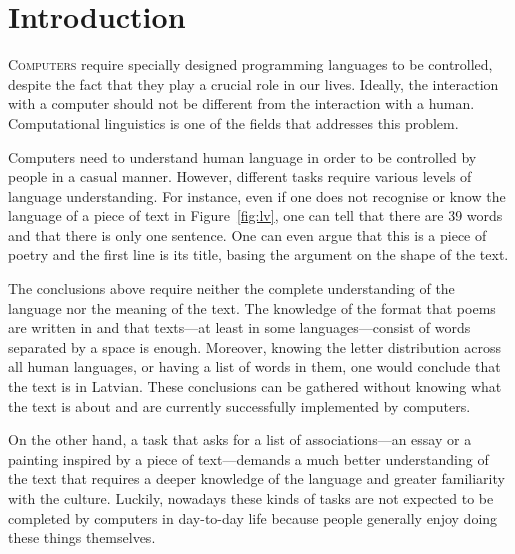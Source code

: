 \chapter{Introduction}
\label{ch:introduction}

\lettrine[lines=5,loversize=0.25]{C}{omputers} require specially designed programming languages to be controlled, despite the fact that they play a crucial role in our lives. Ideally, the interaction with a computer should not be different from the interaction with a human. Computational linguistics is one of the fields that addresses this problem.
% 
% 

Computers need to understand human language in order to be controlled by people in a casual manner. However, different tasks require various levels of language understanding. For instance, even if one does not recognise or know the language of a piece of text in Figure~\ref{fig:lv}, one can tell that there are 39 words and that there is only one sentence. One can even argue that this is a piece of poetry and the first line is its title, basing the argument on the shape of the text.

The conclusions above require neither the complete understanding of the language nor the meaning of the text. The knowledge of the format that poems are written in and that texts---at least in some languages---consist of words separated by a space is enough. Moreover, knowing the letter distribution across all human languages, or having a list of words in them, one would conclude that the text is in Latvian. These conclusions can be gathered without knowing what the text is about and are currently successfully implemented by computers.



On the other hand, a task that asks for a list of associations---an essay or a painting inspired by a piece of text---demands a much better understanding of the text that requires a deeper knowledge of the language and greater familiarity with the culture. Luckily, nowadays these kinds of tasks are not expected to be completed by computers in day-to-day life because people generally enjoy doing these things themselves.

